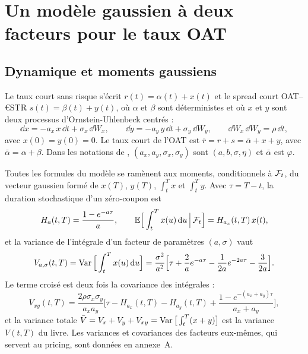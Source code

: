 \section{Un modèle gaussien à deux facteurs pour le taux OAT}
\label{sec:modele}

\subsection{Dynamique et moments gaussiens}

Le taux court sans risque s'écrit $r(t) = \alpha(t) + x(t)$ et le spread court OAT–€STR
$s(t) = \beta(t) + y(t)$, où $\alpha$ et $\beta$ sont déterministes et où $x$ et $y$ sont deux processus
d'Ornstein-Uhlenbeck centrés \citep[éq.~4.4-4.5]{BrigoMercurio2006} :
\begin{equation}
\dd x = -a_x\,x\,\dd t + \sigma_x\,\dd W_x,\qquad \dd y = -a_y\,y\,\dd t + \sigma_y\,\dd W_y,\qquad
\dd W_x\,\dd W_y = \rho\,\dd t,
\label{eq:dynamique}
\end{equation}
avec $x(0) = y(0) = 0$.
Le taux court de l'OAT est $\bar r = r + s = \bar\alpha + x + y$, avec $\bar\alpha = \alpha + \beta$. Dans les
notations de \citet{BrigoMercurio2006}, $(a_x, a_y, \sigma_x, \sigma_y)$ sont $(a, b, \sigma, \eta)$ et
$\bar\alpha$ est $\varphi$.

Toutes les formules du modèle se ramènent aux moments, conditionnels à $\mathcal{F}_t$, du vecteur gaussien formé de
$x(T)$, $y(T)$, $\int_t^T x$ et $\int_t^T y$. Avec $\tau = T - t$, la duration stochastique d'un zéro-coupon est
\begin{equation}
H_a(t,T) = \frac{1-e^{-a\tau}}{a}, \qquad \mathbb{E}\Big[\int_t^T x(u)\,\mathrm{d} u \,\Big|\, \mathcal{F}_t\Big] = H_{a_x}(t,T)\,x(t),
\end{equation}
et la variance de l'intégrale d'un facteur de paramètres $(a,\sigma)$ vaut
\begin{equation}
V_{a,\sigma}(t,T) = \operatorname{Var}\Big[\int_t^T x(u)\,\mathrm{d} u\Big]
= \frac{\sigma^2}{a^2}\Big[\tau + \frac{2}{a}e^{-a\tau} - \frac{1}{2a}e^{-2a\tau} - \frac{3}{2a}\Big].
\end{equation}
Le terme croisé est deux fois la covariance des intégrales \citep[lemme~4.2.1, éq.~4.10]{BrigoMercurio2006} :
\begin{equation}
V_{xy}(t,T) = \frac{2\rho\sigma_x\sigma_y}{a_x a_y}\Big[\tau - H_{a_x}(t,T) - H_{a_y}(t,T)
+ \frac{1-e^{-(a_x+a_y)\tau}}{a_x+a_y}\Big],
\end{equation}
et la variance totale $\bar V = V_x + V_y + V_{xy} = \operatorname{Var}\big[\int_t^T (x+y)\big]$ est la variance $V(t,T)$ du
livre. Les variances et covariances des facteurs eux-mêmes, qui servent au pricing, sont données en annexe~A.


